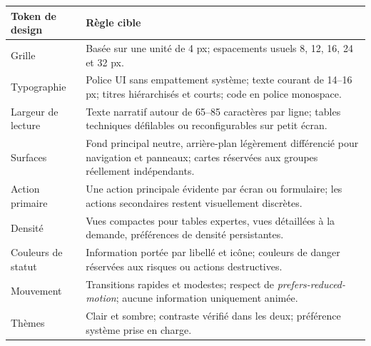 \documentclass[11pt,a4paper]{article}
\begin{document}
\begin{longtable}{p{}p{}}
\toprule
\textbf{Token de design} & \textbf{Règle cible}\\
\midrule
Grille & Basée sur une unité de 4 px; espacements usuels 8, 12, 16, 24 et 32 px.\\
Typographie & Police UI sans empattement système; texte courant de 14--16 px; titres hiérarchisés et courts; code en police monospace.\\
Largeur de lecture & Texte narratif autour de 65--85 caractères par ligne; tables techniques défilables ou reconfigurables sur petit écran.\\
Surfaces & Fond principal neutre, arrière-plan légèrement différencié pour navigation et panneaux; cartes réservées aux groupes réellement indépendants.\\
Action primaire & Une action principale évidente par écran ou formulaire; les actions secondaires restent visuellement discrètes.\\
Densité & Vues compactes pour tables expertes, vues détaillées à la demande, préférences de densité persistantes.\\
Couleurs de statut & Information portée par libellé et icône; couleurs de danger réservées aux risques ou actions destructives.\\
Mouvement & Transitions rapides et modestes; respect de \emph{prefers-reduced-motion}; aucune information uniquement animée.\\
Thèmes & Clair et sombre; contraste vérifié dans les deux; préférence système prise en charge.\\
\bottomrule
\end{longtable}
\end{document}
